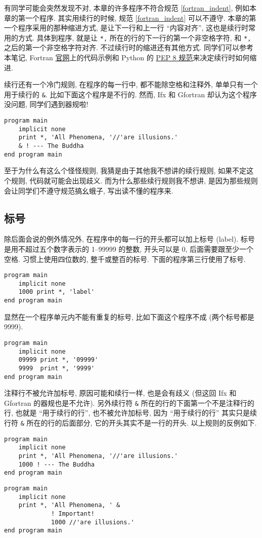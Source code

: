 有同学可能会突然发现不对, 本章的许多程序不符合规范 \ref{fortran_indent}, 例如本章的第一个程序. 其实用续行的时候, 规范 \ref{fortran_indent} 可以不遵守. 本章的第一个程序采用的那种缩进方式, 是让下一行和上一行 ``内容对齐'', 这也是续行时常用的方式. 具体到程序, 就是让 \texttt{*,} 所在的行的下一行的第一个非空格字符, 和 \texttt{*,} 之后的第一个非空格字符对齐. 不过续行时的缩进还有其他方式. 同学们可以参考本笔记,  Fortran \href{https://fortran-lang.org/}{官网}上的代码示例和 Python 的 \href{https://peps.python.org/pep-0008/}{PEP 8 规范}来决定续行时如何缩进.

续行还有一个冷门规则, 在程序的每一行中, 都不能除空格和注释外, 单单只有一个用于续行的 \texttt{\&{}}. 比如下面这个程序是不行的. 然而, Ifx 和 Gfortran 却认为这个程序没问题, 同学们遇到器规啦!
\begin{lstlisting}
program main
    implicit none
    print *, 'All Phenomena, '//'are illusions.'
    & ! --- The Buddha
end program main
\end{lstlisting}
至于为什么有这么个怪怪规则, 我猜是由于其他我不想讲的续行规则, 如果不定这个规则, 代码就可能会出现歧义. 而为什么那些续行规则我不想讲, 是因为那些规则会让同学们不遵守规范搞幺蛾子, 写出读不懂的程序来.

\subsection{标号}

除后面会说的例外情况外, 在程序中的每一行的开头都可以加上标号 (label). 标号是用不超过五个数字表示的 1--99999 的整数, 开头可以是 0, 后面需要跟至少一个空格. 习惯上使用四位数的, 整千或整百的标号. 下面的程序第三行使用了标号.
\begin{lstlisting}
program main
    implicit none
    1000 print *, 'label'
end program main
\end{lstlisting}

显然在一个程序单元内不能有重复的标号, 比如下面这个程序不成 (两个标号都是 9999).
\begin{lstlisting}
program main
    implicit none
    09999 print *, '09999'
    9999  print *, '9999'
end program main
\end{lstlisting}

注释行不被允许加标号, 原因可能和续行一样, 也是会有歧义 (但这回 Ifx 和 Gfortran 的器规也是不允许). 另外续行符 \texttt{\&{}} 所在的行的下面第一个不是注释行的行, 也就是 ``用于续行的行'', 也不被允许加标号, 因为 ``用于续行的行'' 其实只是续行符 \texttt{\&{}} 所在的行的后面部分, 它的开头其实不是一行的开头. 以上规则的反例如下.
\begin{lstlisting}
program main
    implicit none
    print *, 'All Phenomena, '//'are illusions.'
    1000 ! --- The Buddha
end program main
\end{lstlisting}
\begin{lstlisting}
program main
    implicit none
    print *, 'All Phenomena, ' &
             ! Important!
             1000 //'are illusions.'
end program main
\end{lstlisting}

